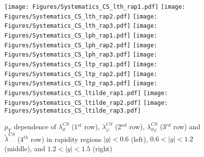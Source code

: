 \documentclass[12pt]{article}
\newcommand{\pT}{p_\mathrm{T}}
\newcommand{\absy}{\left |  y \right |}
\newcommand{\lamthCS}{\lambda^{\scriptscriptstyle CS}_\vartheta}
\newcommand{\lamphCS}{\lambda^{\scriptscriptstyle CS}_\varphi}
\newcommand{\lamthphCS}{\lambda^{\scriptscriptstyle CS}_{\vartheta \varphi}}
\newcommand{\lamtildeCS}{\tilde{\lambda}^{\scriptscriptstyle CS}}
\begin{document}



\begin{figure}[htbp]
\centering
\texttt{[image: Figures/Systematics\_CS\_lth\_rap1.pdf]}
\texttt{[image: Figures/Systematics\_CS\_lth\_rap2.pdf]}
\texttt{[image: Figures/Systematics\_CS\_lth\_rap3.pdf]}
\texttt{[image: Figures/Systematics\_CS\_lph\_rap1.pdf]}
\texttt{[image: Figures/Systematics\_CS\_lph\_rap2.pdf]}
\texttt{[image: Figures/Systematics\_CS\_lph\_rap3.pdf]}
\texttt{[image: Figures/Systematics\_CS\_ltp\_rap1.pdf]}
\texttt{[image: Figures/Systematics\_CS\_ltp\_rap2.pdf]}
\texttt{[image: Figures/Systematics\_CS\_ltp\_rap3.pdf]}
\texttt{[image: Figures/Systematics\_CS\_ltilde\_rap1.pdf]}
\texttt{[image: Figures/Systematics\_CS\_ltilde\_rap2.pdf]}
\texttt{[image: Figures/Systematics\_CS\_ltilde\_rap3.pdf]}
\caption{$\pT$ dependence of $\lamthCS$
(1$^{st}$ row), $\lamphCS$ (2$^{nd}$ row), $\lamthphCS$ (3$^{rd}$ row) and 
$\lamtildeCS$ (4$^{th}$ row) in rapidity regions $\absy<0.6$ (left), 
$0.6<\absy<1.2$ (middle), and $1.2<\absy<1.5$ (right)}
\end{figure}
\clearpage
\end{document}
